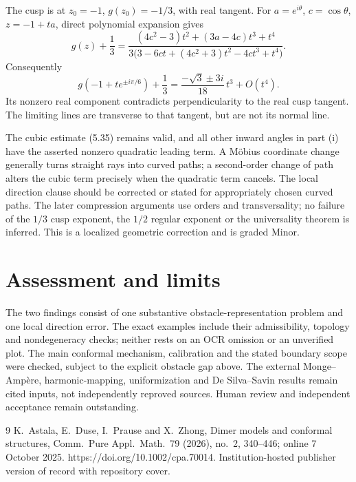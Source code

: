 \documentclass[10pt]{article}
\begin{document}
The cusp is at \(z_0=-1\), \(g(z_0)=-1/3\), with real tangent. For \(a=e^{i\theta}\), \(c=\cos\theta\), \(z=-1+ta\), direct polynomial expansion gives \[g(z)+\frac13
 =\frac{(4c^2-3)t^2+(3a-4c)t^3+t^4}
 {3\bigl(3-6ct+(4c^2+3)t^2-4ct^3+t^4\bigr)}.\] Consequently \[g(-1+te^{\pm i\pi/6})+\frac13
       =\frac{-\sqrt3\pm3i}{18}\,t^3+O(t^4).\] Its nonzero real component contradicts perpendicularity to the real cusp tangent. The limiting lines are transverse to that tangent, but are not its normal line.\par
The cubic estimate (5.35) remains valid, and all other inward angles in part (i) have the asserted nonzero quadratic leading term. A Möbius coordinate change generally turns straight rays into curved paths; a second-order change of path alters the cubic term precisely when the quadratic term cancels. The local direction clause should be corrected or stated for appropriately chosen curved paths. The later compression arguments use orders and transversality; no failure of the \(1/3\) cusp exponent, the \(1/2\) regular exponent or the universality theorem is inferred. This is a localized geometric correction and is graded Minor.\par
\section*{Assessment and limits}
The two findings consist of one substantive obstacle-representation problem and one local direction error. The exact examples include their admissibility, topology and nondegeneracy checks; neither rests on an OCR omission or an unverified plot. The main conformal mechanism, calibration and the stated boundary scope were checked, subject to the explicit obstacle gap above. The external Monge–Ampère, harmonic-mapping, uniformization and De Silva–Savin results remain cited inputs, not independently reproved sources. Human review and independent acceptance remain outstanding.\par
9 K. Astala, E. Duse, I. Prause and X. Zhong, Dimer models and conformal structures, Comm. Pure Appl. Math. 79 (2026), no. 2, 340–446; online 7 October 2025. https://doi.org/10.1002/cpa.70014. Institution-hosted publisher version of record with repository cover.\par
\end{document}
